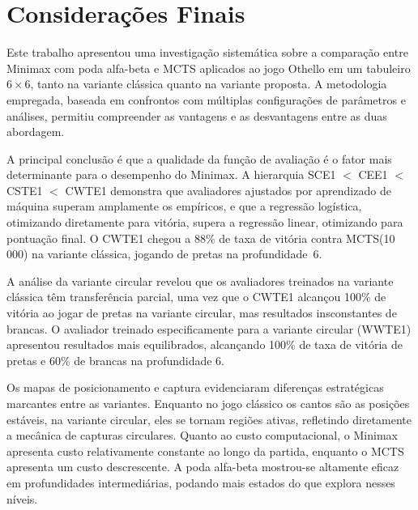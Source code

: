 \documentclass[12pt]{article}
\begin{document}
\section{Considerações Finais}
 
Este trabalho apresentou uma investigação sistemática sobre a comparação entre Minimax com
poda alfa-beta e MCTS aplicados ao jogo Othello em um tabuleiro $6\!\times\!6$, tanto na variante
clássica quanto na variante proposta. A metodologia empregada, baseada em confrontos
com múltiplas configurações de parâmetros e análises, permitiu compreender as vantagens e as desvantagens entre as duas abordagem.


A principal conclusão é que a qualidade da função de avaliação é o fator mais determinante para
o desempenho do Minimax. A hierarquia SCE1 $<$ CEE1 $<$ CSTE1 $<$ CWTE1 demonstra que
avaliadores ajustados por aprendizado de máquina superam amplamente os empíricos, e que a
regressão logística, otimizando diretamente para vitória, supera a regressão linear, otimizando para pontuação final. O CWTE1 chegou a 88\% de taxa de vitória contra
MCTS(10\,000) na variante clássica, jogando de pretas na profundidade~6.
 
A análise da variante circular revelou que os avaliadores treinados na variante clássica têm
transferência parcial, uma vez que o CWTE1 alcançou 100\% de vitória ao jogar de pretas na variante
circular, mas resultados insconstantes de brancas. O avaliador treinado especificamente para a
variante circular (WWTE1) apresentou resultados mais equilibrados, alcançando 100\% de taxa de vitória de pretas e 60\% de
brancas na profundidade 6.
 
Os mapas de posicionamento e captura evidenciaram diferenças estratégicas marcantes entre as
variantes. Enquanto no jogo clássico os cantos são as posições estáveis, na variante
circular, eles se tornam regiões ativas, refletindo diretamente a mecânica de capturas
circulares. Quanto ao custo computacional, o Minimax apresenta custo relativamente constante ao longo da
partida, enquanto o MCTS apresenta um custo descrescente. A poda alfa-beta mostrou-se altamente eficaz em profundidades intermediárias,
podando mais estados do que explora nesses níveis.
 
\end{document}

